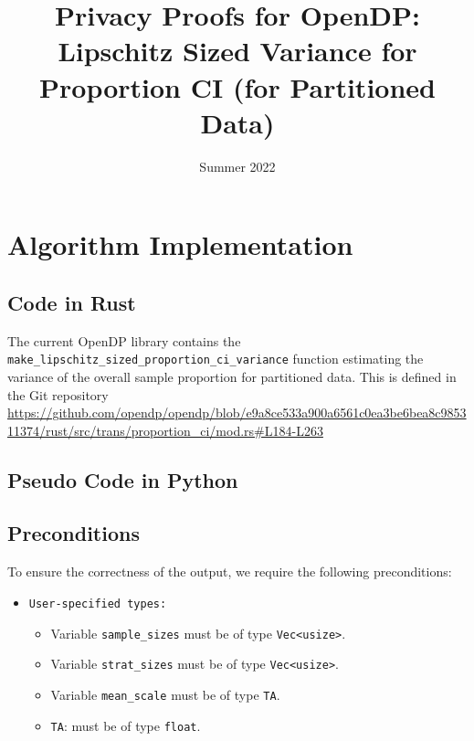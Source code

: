 \documentclass[11pt,a4paper]{article}
\title{Privacy Proofs for OpenDP: Lipschitz Sized Variance for Proportion CI (for Partitioned Data)}
\author{}
\date{Summer 2022}
\begin{document}
\maketitle
\tableofcontents


\section{Algorithm Implementation}





\subsection{Code in Rust}



The current OpenDP library contains the \texttt{make\_lipschitz\_sized\_proportion\_ci\_variance} function estimating the variance of the overall sample proportion for partitioned data. This is defined 
in the Git repository \url{https://github.com/opendp/opendp/blob/e9a8ce533a900a6561c0ea3be6bea8c985311374/rust/src/trans/proportion_ci/mod.rs#L184-L263}




\subsection{Pseudo Code in Python} \label{sec:pseudocode}

\subsection*{Preconditions}
To ensure the correctness of the output, we require the following preconditions:

\begin{itemize}
    \item \texttt{User-specified types:}
    \begin{itemize}
        \item Variable \texttt{sample\_sizes} must be of type \texttt{Vec<usize>}. 
        \item Variable \texttt{strat\_sizes} must be of type \texttt{Vec<usize>}.
        \item Variable \texttt{mean\_scale} must be of type \texttt{TA}. 
        \item \texttt{TA}: must be of type  \texttt{float}.
    \end{itemize}
    
\end{itemize}
\end{document}
